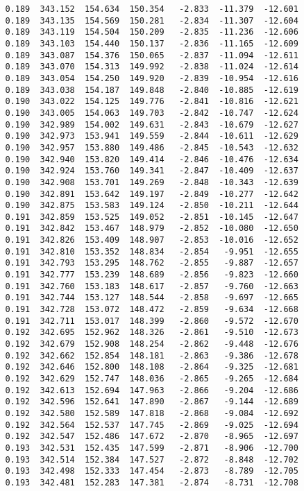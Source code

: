 \begin{verbatim}
   0.189  343.152  154.634  150.354   -2.833  -11.379  -12.601
   0.189  343.135  154.569  150.281   -2.834  -11.307  -12.604
   0.189  343.119  154.504  150.209   -2.835  -11.236  -12.606
   0.189  343.103  154.440  150.137   -2.836  -11.165  -12.609
   0.189  343.087  154.376  150.065   -2.837  -11.094  -12.611
   0.189  343.070  154.313  149.992   -2.838  -11.024  -12.614
   0.189  343.054  154.250  149.920   -2.839  -10.954  -12.616
   0.189  343.038  154.187  149.848   -2.840  -10.885  -12.619
   0.190  343.022  154.125  149.776   -2.841  -10.816  -12.621
   0.190  343.005  154.063  149.703   -2.842  -10.747  -12.624
   0.190  342.989  154.002  149.631   -2.843  -10.679  -12.627
   0.190  342.973  153.941  149.559   -2.844  -10.611  -12.629
   0.190  342.957  153.880  149.486   -2.845  -10.543  -12.632
   0.190  342.940  153.820  149.414   -2.846  -10.476  -12.634
   0.190  342.924  153.760  149.341   -2.847  -10.409  -12.637
   0.190  342.908  153.701  149.269   -2.848  -10.343  -12.639
   0.190  342.891  153.642  149.197   -2.849  -10.277  -12.642
   0.190  342.875  153.583  149.124   -2.850  -10.211  -12.644
   0.191  342.859  153.525  149.052   -2.851  -10.145  -12.647
   0.191  342.842  153.467  148.979   -2.852  -10.080  -12.650
   0.191  342.826  153.409  148.907   -2.853  -10.016  -12.652
   0.191  342.810  153.352  148.834   -2.854   -9.951  -12.655
   0.191  342.793  153.295  148.762   -2.855   -9.887  -12.657
   0.191  342.777  153.239  148.689   -2.856   -9.823  -12.660
   0.191  342.760  153.183  148.617   -2.857   -9.760  -12.663
   0.191  342.744  153.127  148.544   -2.858   -9.697  -12.665
   0.191  342.728  153.072  148.472   -2.859   -9.634  -12.668
   0.191  342.711  153.017  148.399   -2.860   -9.572  -12.670
   0.192  342.695  152.962  148.326   -2.861   -9.510  -12.673
   0.192  342.679  152.908  148.254   -2.862   -9.448  -12.676
   0.192  342.662  152.854  148.181   -2.863   -9.386  -12.678
   0.192  342.646  152.800  148.108   -2.864   -9.325  -12.681
   0.192  342.629  152.747  148.036   -2.865   -9.265  -12.684
   0.192  342.613  152.694  147.963   -2.866   -9.204  -12.686
   0.192  342.596  152.641  147.890   -2.867   -9.144  -12.689
   0.192  342.580  152.589  147.818   -2.868   -9.084  -12.692
   0.192  342.564  152.537  147.745   -2.869   -9.025  -12.694
   0.192  342.547  152.486  147.672   -2.870   -8.965  -12.697
   0.193  342.531  152.435  147.599   -2.871   -8.906  -12.700
   0.193  342.514  152.384  147.527   -2.872   -8.848  -12.702
   0.193  342.498  152.333  147.454   -2.873   -8.789  -12.705
   0.193  342.481  152.283  147.381   -2.874   -8.731  -12.708

\end{verbatim}
